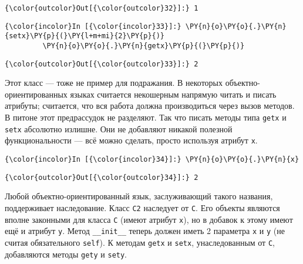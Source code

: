             \begin{Verbatim}[commandchars=\\\{\}]
{\color{outcolor}Out[{\color{outcolor}32}]:} 1
\end{Verbatim}
        
    \begin{Verbatim}[commandchars=\\\{\}]
{\color{incolor}In [{\color{incolor}33}]:} \PY{n}{o}\PY{o}{.}\PY{n}{setx}\PY{p}{(}\PY{l+m+mi}{2}\PY{p}{)}
         \PY{n}{o}\PY{o}{.}\PY{n}{getx}\PY{p}{(}\PY{p}{)}
\end{Verbatim}

            \begin{Verbatim}[commandchars=\\\{\}]
{\color{outcolor}Out[{\color{outcolor}33}]:} 2
\end{Verbatim}
        
    Этот класс --- тоже не пример для подражания. В некоторых
объектно-ориентированных языках считается некошерным напрямую читать и
писать атрибуты; считается, что вся работа должна производиться через
вызов методов. В питоне этот предрассудок не разделяют. Так что писать
методы типа \texttt{getx} и \texttt{setx} абсолютно излишне. Они не
добавляют никакой полезной функциональности --- всё можно сделать, просто
используя атрибут \texttt{x}.

    \begin{Verbatim}[commandchars=\\\{\}]
{\color{incolor}In [{\color{incolor}34}]:} \PY{n}{o}\PY{o}{.}\PY{n}{x}
\end{Verbatim}

            \begin{Verbatim}[commandchars=\\\{\}]
{\color{outcolor}Out[{\color{outcolor}34}]:} 2
\end{Verbatim}
        
    Любой объектно-ориентированный язык, заслуживающий такого названия,
поддерживает наследование. Класс \texttt{C2} наследует от \texttt{C}.
Его объекты являются вполне законными для класса \texttt{C} (имеют
атрибут \texttt{x}), но в добавок к этому имеют ещё и атрибут
\texttt{y}. Метод \texttt{\_\_init\_\_} теперь должен иметь 2 параметра
\texttt{x} и \texttt{y} (не считая обязательного \texttt{self}). К
методам \texttt{getx} и \texttt{setx}, унаследованным от \texttt{C},
добавляются методы \texttt{gety} и \texttt{sety}.

